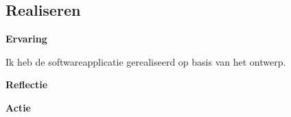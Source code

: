 \subsection{Realiseren}
\textbf{Ervaring}

\whitespace
Ik heb de softwareapplicatie gerealiseerd op basis van het ontwerp.

\whitespace
\textbf{Reflectie}

\whitespace
{}

\whitespace
\textbf{Actie}

\whitespace
{}
